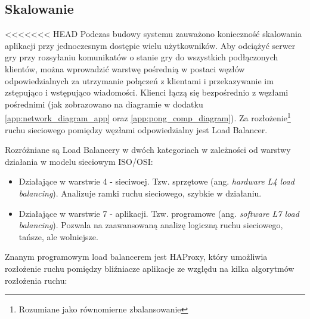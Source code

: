 \subsection{Skalowanie}
\label{subsub:scalability}

<<<<<<< HEAD
Podczas budowy systemu zauważono konieczność skalowania aplikacji przy jednoczesnym dostępie wielu użytkowników. Aby odciążyć serwer gry przy rozsyłaniu komunikatów o stanie gry do wszystkich podłączonych klientów, można wprowadzić warstwę pośrednią w postaci węzłów odpowiedzialnych za utrzymanie połączeń z klientami i przekazywanie im zstępująco i wstępująco wiadomości. Klienci łączą się bezpośrednio z węzłami pośrednimi (jak zobrazowano na diagramie w dodatku \ref{app:network_diagram_app} oraz \ref{app:pong_comp_diagram}). Za rozłożenie\footnote{Rozumiane jako równomierne zbalansowanie} ruchu sieciowego pomiędzy węzłami odpowiedzialny jest Load Balancer.

Rozróżniane są Load Balancery w dwóch kategoriach w zależności od warstwy działania w modelu sieciowym ISO/OSI:
\begin{itemize}
	\item Działające w warstwie 4 - sieciwoej. Tzw. sprzętowe (ang. \emph{hardware L4 load balancing}). Analizuje ramki ruchu sieciowego, szybkie w działaniu.
	\item Działające w warstwie 7 - aplikacji. Tzw. programowe (ang. \emph{software L7 load balancing}). Pozwala na zaawansowaną analizę logiczną ruchu sieciowego, tańsze, ale wolniejsze.
\end{itemize}

Znanym programowym load balancerem jest HAProxy, który umożliwia rozłożenie ruchu pomiędzy bliźniacze aplikacje ze względu na kilka algorytmów rozłożenia ruchu\cite{haproxy-conf}:

